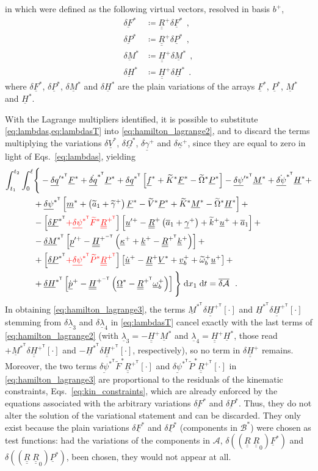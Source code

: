 \documentclass[12pt,a4paper,oneside,english]{abntex2} %
\newcommand{\fix}[1]{{\color{red}#1}}
\newcommand{\vect}[1]{\underline{#1}}
\newcommand{\uvec}[1]{\overline{#1}}
\def\tens#1{\underline{\underline{#1}}}
\def\til#1{\widetilde{#1}}
\def\lb{\left[}
\def\rb{\right]}
\def\lp{\left(}
\def\rp{\right)}
\def\T{\mathsf{T}}
\def\A{\mathcal{A}}
\def\bp{b^+}
\def\B*{\mathcal{B}^*}
\def\xo{x_1}
\def\aone{\uvec{a}_1}
\def\aonetil{\til{a}_1}
\def\R{\tens{R}}
\def\Rp{\R^+}
\def\RpT{\R^{+^\T}}
\def\Rz{\R_0}
\def\u{\vect{u}}
\def\uplus{\u^{+}}
\def\updot{\dot{\u}^{+}}
\def\upprime{\u^{\prime+}}
\def\vb{\vect{v}_b}
\def\vbplus{\vb^{+}}
\def\om{\vect{\omega}_b}
\def\omp{\om^{+}}
\def\omtil{\til{\omega}_b}
\def\omtilp{\omtil^{+}}
\def\gam{\vect{\gamma}}
\def\gamp{\gam^{+}}
\def\gamptil{\til{\gamma}^{+}}
\def\kap{\vect{\kappa}}
\def\kapp{\kap^{+}}
\def\k{\vect{k}}
\def\kp{\k^{+}}
\def\ktil{\til{k}}
\def\ktilp{\ktil^{+}}
\def\Ktil{\til{K}}
\def\Ktils{\Ktil^{*}}
\def\V{\vect{V}}
\def\Vs{\V^{*}}
\def\Vtils{\til{V}^{*}}
\def\Om{\vect{\Omega}}
\def\Oms{\Om^{*}}
\def\Omtil{\til{\Omega}}
\def\Omtils{\Omtil^{*}}
\def\P{\vect{P}}
\def\Ps{\P^*}
\def\Ptils{\til{P}^{*}}
\def\Hv{\vect{H}}
\def\Hvs{\Hv^*}
\def\HvsT{\Hv^{*^\T}}
\def\H{\tens{H}}
\def\Hp{\H^{+}}
\def\HpT{\H^{+^\T}}
\def\HpmT{\H^{+^{-\T}}}
\def\p{\vect{p}}
\def\pdot{\dot{\p}}
\def\ppdot{\pdot^{+}}
\def\ppprime{\p^{\prime{+}}}
\def\F{\vect{F}}
\def\Fs{\F^*}
\def\Ftils{\til{F}^*}
\def\M{\vect{M}}
\def\Ms{\M^*}
\def\MsT{\M^{*^\T}}
\def\f{\vect{f}}
\def\fs{\f^*}
\def\m{\vect{m}}
\def\ms{\m^*}
\def\delF{\vect{\delta F}}
\def\delM{\vect{\delta M}}
\def\delP{\vect{\delta P}}
\def\delH{\vect{\delta H}}
\def\delFs{\delF^*}
\def\delFsT{\delF^{*^\T}}
\def\delMs{\delM^*}
\def\delMsT{\delM^{*^\T}}
\def\delPs{\delP^*}
\def\delPsT{\delP^{*^\T}}
\def\delHs{\delH^*}
\def\delHsT{\delH^{*^\T}}
\def\delq{\vect{\delta q}}
\def\delqdotsT{\dot{\delq}^{*^\T}}
\def\delqsT{\delq^{*^\T}}
\def\delqpsT{\delq^{{\prime*}^\T}}
\def\delpsi{\vect{\delta\psi}}
\def\delpsisT{\delpsi^{*^\T}}
\def\delpsipsT{\delpsi^{\prime*^\T}}
\def\delpsidot{\dot{\delpsi}}
\def\delpsisdotT{\delpsidot^{*^\T}}
\def\lamb{\vect{\lambda}}
\def\intt{\int_{t_1}^{t_2}}
\def\intl{\int_{0}^{\ell}}
\def\d{\textnormal{d}}
\def\RRz{\lp\R\;\Rz\rp}
\begin{document}
in which were defined as the following \fix{virtual vectors, resolved in basis $\bp$,}
\begin{equation}
    \begin{aligned}
        \delFs &\coloneqq \Rp\delta\Fs \ \ ,
        \\
        \delPs &\coloneqq \Rp\delta\Ps \ \ ,
        \\
        \delMs &\coloneqq \Hp\delta\Ms \ \ ,
        \\
        \delHs &\coloneqq \Hp\delta\Hvs \ \ .
        \label{eq:delFPMHsT} 
    \end{aligned}
\end{equation}
\fix{where $\delta\Fs$, $\delta\Ps$, $\delta\Ms$ and $\delta\Hvs$ are the plain variations of the arrays $\Fs$, $\Ps$, $\Ms$ and $\Hvs$}.

With the Lagrange multipliers identified, it is possible to substitute \cref{eq:lambdas,eq:lambdasT} into \cref{eq:hamilton_lagrange2}, and to discard the terms multiplying the variations $\delta\Vs$, $\delta\Oms$, $\delta\gamp$ and $\delta\kapp$, since they are equal to zero in light of Eqs.~\eqref{eq:lambdas}, yielding
\begin{align}
    \intt\intl &\Biggl\{\Biggr. -\delqpsT\Fs + \delqdotsT\Ps + \delqsT\lb\fs+\Ktils\Fs-\Omtils\Ps\rb - \delpsipsT\Ms + \delpsisdotT\Hvs + \nonumber 
    \\
    & +\delpsisT\lb\ms+\lp\aonetil+\gamptil\rp\Fs-\Vtils\Ps+\Ktils\Ms-\Omtils\Hvs\rb + \nonumber \\
    &-\lb\delFsT \fix{+ \delpsisT\Ftils\RpT}\rb \lb\upprime-\Rp\lp\aone+\gamp\rp+\ktilp\uplus+\aone\rb + \nonumber 
    \\
    &-\delMsT \lb\ppprime-\HpmT\lp\kapp+\kp-\RpT\kp\rp\rb  + \nonumber 
    \\
    &+\lb\delPsT \fix{+ \delpsisT\Ptils\RpT}\rb\lb\updot-\Rp\Vs+\vbplus+\omtilp\uplus\rb + \nonumber 
    \\
    &+\delHsT\lb\ppdot-\HpmT\lp\Oms-\RpT\omp\rp\rb
    \Biggl.\Biggr\}\;\d \xo\;\d t = \overline{\delta\A} \ \ .
    \label{eq:hamilton_lagrange3}
\end{align}
\fix{In obtaining \cref{eq:hamilton_lagrange3}, the terms $\MsT\delta\HpT\lb\cdot\rb$ and $\HvsT\delta\HpT\lb\cdot\rb$ stemming from $\delta\lamb_3$ and $\delta\lamb_4$ in \cref{eq:lambdasT} cancel exactly with the last terms of \cref{eq:hamilton_lagrange2} (with $\lamb_3=-\Hp\Ms$ and $\lamb_4=\Hp\Hvs$, those read $+\MsT\delta\HpT\lb\cdot\rb$ and $-\HvsT\delta\HpT\lb\cdot\rb$, respectively), so no term in $\delta\Hp$ remains. Moreover, the two terms $\delpsisT\Ftils\RpT\lb\cdot\rb$ and $\delpsisT\Ptils\RpT\lb\cdot\rb$ in \cref{eq:hamilton_lagrange3} are proportional to the residuals of the kinematic constraints, Eqs.~\eqref{eq:kin_constraints}, which are already enforced by the equations associated with the arbitrary variations $\delFs$ and $\delPs$. Thus, they do not alter the solution of the variational statement and can be discarded. They only exist because the plain variations $\delta\Fs$ and $\delta\Ps$ (components in $\B*$) were chosen as test functions: had the variations of the components in $\A$, $\delta\lp\RRz\Fs\rp$ and $\delta\lp\RRz\Ps\rp$, been chosen, they would not appear at all.} 
\end{document}
